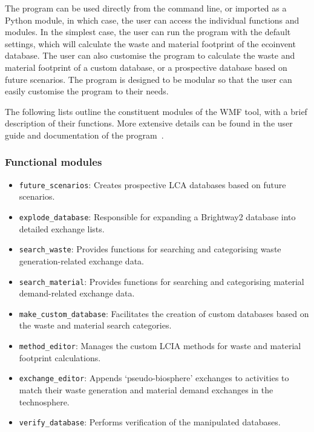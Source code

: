 The program can be used directly from the command line, or imported as a Python module, in which case, the user can access the individual functions and modules. In the simplest case, the user can run the program with the default settings, which will calculate the waste and material footprint of the ecoinvent database. The user can also customise the program to calculate the waste and material footprint of a custom database, or a prospective database based on future scenarios. The program is designed to be modular so that the user can easily customise the program to their needs.

The following lists outline the constituent modules of the WMF tool, with a brief description of their functions. More extensive details can be found in the user guide and documentation of the program~\citep{mcdowall2023wmfdocs}.

\subsubsection{Functional modules}
\begin{itemize}
    \item \texttt{future\_scenarios}: Creates prospective LCA databases based on future scenarios.
    \item \texttt{explode\_database}: Responsible for expanding a Brightway2 database into detailed exchange lists.
    \item \texttt{search\_waste}: Provides functions for searching and categorising waste generation-related exchange data.
    \item \texttt{search\_material}: Provides functions for searching and categorising material demand-related exchange data.
    \item \texttt{make\_custom\_database}: Facilitates the creation of custom databases based on the waste and material search categories.
    \item \texttt{method\_editor}: Manages the custom LCIA methods for waste and material footprint calculations.
    \item \texttt{exchange\_editor}: Appends `pseudo-biosphere' exchanges to activities to match their waste generation and material demand exchanges in the technosphere.
    \item \texttt{verify\_database}: Performs verification of the manipulated databases.
\end{itemize}

